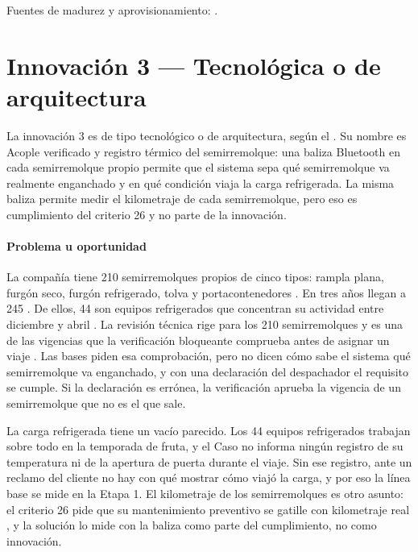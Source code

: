 Fuentes de madurez y aprovisionamiento: \parencite{d3_nasa_trl,d3_device_twins,d3_device_update}.

\section{Innovación 3 — Tecnológica o de arquitectura}\label{sec:13-innovacion-3}

La innovación 3 es de tipo tecnológico o de arquitectura, según el . Su nombre es
Acople verificado y registro térmico del semirremolque: una baliza Bluetooth en cada semirremolque propio permite que el sistema sepa
qué semirremolque va realmente enganchado y en qué condición viaja la carga refrigerada. La misma baliza
permite medir el kilometraje de cada semirremolque, pero eso es cumplimiento del criterio 26 y no parte
de la innovación.

\paragraph{Problema u oportunidad} La compañía tiene 210 semirremolques propios de cinco tipos: rampla
plana, furgón seco, furgón refrigerado, tolva y portacontenedores . En tres años
llegan a 245 . De ellos, 44 son equipos refrigerados que concentran su
actividad entre diciembre y abril . La revisión técnica rige para los 210
semirremolques  y es una de las vigencias que la verificación bloqueante
comprueba antes de asignar un viaje . Las bases piden esa comprobación, pero no
dicen cómo sabe el sistema qué semirremolque va enganchado, y con una declaración del despachador el
requisito se cumple. Si la declaración es errónea, la verificación aprueba la vigencia de un
semirremolque que no es el que sale.

La carga refrigerada tiene un vacío parecido. Los 44 equipos refrigerados trabajan sobre todo en la
temporada de fruta, y el Caso no informa ningún registro de su temperatura ni de la apertura de puerta
durante el viaje. Sin ese registro, ante un reclamo del cliente no hay con qué mostrar cómo viajó la
carga, y por eso la línea base se mide en la Etapa 1. El kilometraje de los
semirremolques es otro asunto: el criterio 26 pide que su mantenimiento preventivo se gatille con
kilometraje real , y la solución lo mide con la baliza como parte del
cumplimiento, no como innovación.

